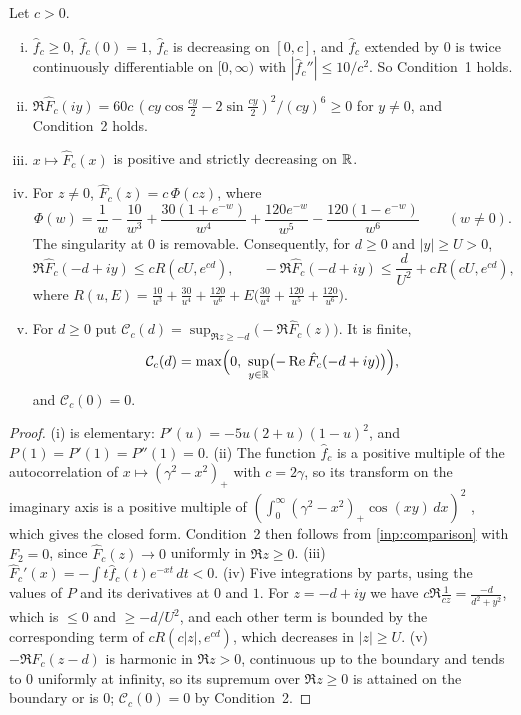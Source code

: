 \begin{lemma}\label{lem:parabolic}
Let $c>0$.
\begin{enumerate}[(i)]
  \item $\hat f_c\ge0$, $\hat f_c(0)=1$, $\hat f_c$ is decreasing on $[0,c]$, and $\hat f_c$ extended by
    $0$ is twice continuously differentiable on $[0,\infty)$ with $|\hat f_c''|\le10/c^2$. So
    Condition~1 holds.
  \item $\Re\hat F_c(iy)=60c\,(cy\cos\frac{cy}2-2\sin\frac{cy}2)^2/(cy)^6\ge0$ for $y\ne0$, and
    Condition~2 holds.
  \item $x\mapsto\hat F_c(x)$ is positive and strictly decreasing on $\mathbb{R}$.
  \item For $z\ne0$, $\hat F_c(z)=c\,\Phi(cz)$, where
    \[
      \Phi(w)=\frac1w-\frac{10}{w^3}+\frac{30(1+e^{-w})}{w^4}
        +\frac{120e^{-w}}{w^5}-\frac{120(1-e^{-w})}{w^6}\qquad(w\ne0).
    \]
    The singularity at $0$ is removable. Consequently, for $d\ge0$ and $|y|\ge U>0$,
    \[
      \Re\hat F_c(-d+iy)\le cR(cU,e^{cd}),\qquad-\Re\hat F_c(-d+iy)\le\frac d{U^2}+cR(cU,e^{cd}),
    \]
    where $R(u,E)=\frac{10}{u^3}+\frac{30}{u^4}+\frac{120}{u^6}+E\bigl(\frac{30}{u^4}+\frac{120}{u^5}+\frac{120}{u^6}\bigr)$.
  \item For $d\ge0$ put $\mathcal C_c(d)=\sup_{\Re z\ge-d}\bigl(-\Re\hat F_c(z)\bigr)$. It is finite,
    \[
      \mathcal C_c(d)=\max\Bigl(0,\ \sup_{y\in\RR}\bigl(-\Re\hat F_c(-d+iy)\bigr)\Bigr),
    \]
    and $\mathcal C_c(0)=0$.
\end{enumerate}
\end{lemma}

\begin{proof}
(i) is elementary: $P'(u)=-5u(2+u)(1-u)^2$, and $P(1)=P'(1)=P''(1)=0$. (ii) The function
$\hat f_c$ is a positive multiple of the autocorrelation of $x\mapsto(\gamma^2-x^2)_+$ with $c=2\gamma$, so
its transform on the imaginary axis is a positive multiple of $(\int_0^\infty(\gamma^2-x^2)_+\cos(xy)\,dx)^2$
\cite[Lemma~3.6]{Xylouris2011nullstellen}, which gives the closed form. Condition~2 then follows from
\cref{inp:comparison} with $F_2=0$, since $\hat F_c(z)\to0$ uniformly in $\Re z\ge0$. (iii)
$\hat F_c'(x)=-\int t\hat f_c(t)e^{-xt}\,dt<0$. (iv) Five integrations by parts, using the values of
$P$ and its derivatives at $0$ and $1$. For $z=-d+iy$ we have $c\Re\frac1{cz}=\frac{-d}{d^2+y^2}$, which is
$\le0$ and $\ge-d/U^2$, and each other term is bounded by the corresponding term of $cR(c|z|,e^{cd})$,
which decreases in $|z|\ge U$. (v) $-\Re\hat F_c(z-d)$ is harmonic in $\Re z>0$, continuous up to the
boundary and tends to $0$ uniformly at infinity, so its supremum over $\Re z\ge0$ is attained on
the boundary or is $0$; $\mathcal C_c(0)=0$ by Condition~2.
\end{proof}

